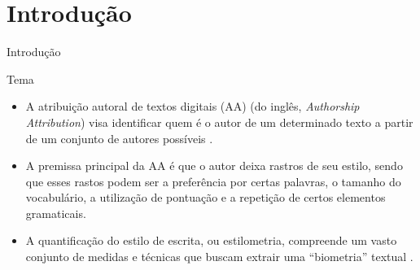 \section{Introdução}

\begin{frame}{Introdução}
	\begin{alertblock}{Tema}
		\begin{itemize}\itemsep9pt
		\item A atribuição autoral de textos digitais (AA) (do inglês, {\it Authorship Attribution})  visa identificar quem é o autor de um determinado texto a partir de um conjunto de autores possíveis \cite{Potthast2017}.
		
		\item A premissa principal da AA é que o autor deixa rastros de seu estilo, sendo que esses rastos podem ser a preferência por certas palavras, o tamanho do vocabulário, a utilização de pontuação e a repetição de certos elementos gramaticais.
		
		\item A quantificação do estilo de escrita, ou estilometria, compreende um vasto conjunto de medidas e técnicas que buscam extrair uma ``biometria'' textual \cite{Neal2017}.
		\end{itemize}
	\end{alertblock}

\end{frame}

